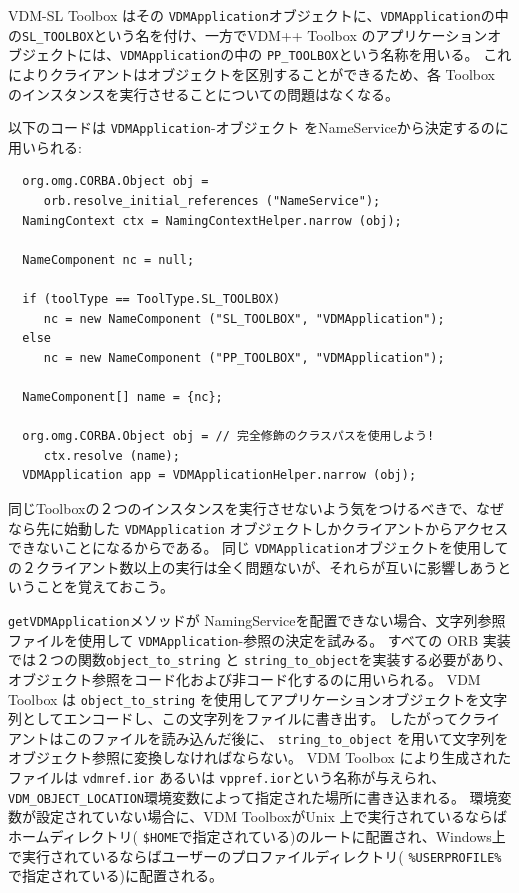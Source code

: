 \documentclass[\pformat,12pt]{jarticle}
\begin{document}
VDM-SL Toolbox はその {\tt VDMApplication}オブジェクトに、{\tt VDMApplication}の中の{\tt SL\_TOOLBOX}という名を付け、一方でVDM++ Toolbox のアプリケーションオブジェクトには、{\tt VDMApplication}の中の {\tt PP\_TOOLBOX}という名称を用いる。
これによりクライアントはオブジェクトを区別することができるため、各 Toolbox のインスタンスを実行させることについての問題はなくなる。

以下のコードは {\tt VDMApplication}-オブジェクト をNameServiceから決定するのに用いられる:

\begin{verbatim}
  org.omg.CORBA.Object obj = 
     orb.resolve_initial_references ("NameService");
  NamingContext ctx = NamingContextHelper.narrow (obj);

  NameComponent nc = null;

  if (toolType == ToolType.SL_TOOLBOX)
     nc = new NameComponent ("SL_TOOLBOX", "VDMApplication");
  else
     nc = new NameComponent ("PP_TOOLBOX", "VDMApplication");

  NameComponent[] name = {nc};
  
  org.omg.CORBA.Object obj = // 完全修飾のクラスパスを使用しよう!
     ctx.resolve (name);
  VDMApplication app = VDMApplicationHelper.narrow (obj);
\end{verbatim}

同じToolboxの２つのインスタンスを実行させないよう気をつけるべきで、なぜなら先に始動した {\tt VDMApplication} オブジェクトしかクライアントからアクセスできないことになるからである。
同じ {\tt VDMApplication}オブジェクトを使用しての２クライアント数以上の実行は全く問題ないが、それらが互いに影響しあうということを覚えておこう。

 {\tt getVDMApplication}メソッドが NamingServiceを配置できない場合、文字列参照ファイルを使用して  {\tt VDMApplication}-参照の決定を試みる。
すべての ORB 実装では２つの関数{\tt  object\_to\_string} と {\tt string\_to\_object}を実装する必要があり、オブジェクト参照をコード化および非コード化するのに用いられる。
 VDM Toolbox は {\tt  object\_to\_string} を使用してアプリケーションオブジェクトを文字列としてエンコードし、この文字列をファイルに書き出す。
したがってクライアントはこのファイルを読み込んだ後に、 {\tt string\_to\_object} を用いて文字列をオブジェクト参照に変換しなければならない。
 VDM Toolbox により生成されたファイルは {\tt  vdmref.ior} あるいは {\tt vppref.ior}という名称が与えられ、{\tt VDM\_OBJECT\_LOCATION}環境変数によって指定された場所に書き込まれる。
環境変数が設定されていない場合に、VDM ToolboxがUnix 上で実行されているならばホームディレクトリ( {\tt  \$HOME}で指定されている)のルートに配置され、Windows上で実行されているならばユーザーのプロファイルディレクトリ( {\tt \%USERPROFILE\%}で指定されている)に配置される。
\end{document}
